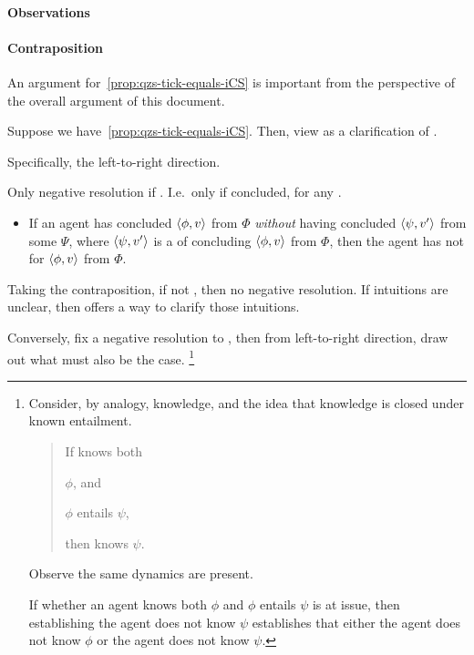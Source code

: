 \paragraph*{Observations}

\paragraph*{Contraposition}

\begin{note}[Contraposition]
  An argument for~\autoref{prop:qzs-tick-equals-iCS} is important from the perspective of the overall argument of this document.

  Suppose we have~\autoref{prop:qzs-tick-equals-iCS}.
  Then, view \izetaS{} as a clarification of \qzS{}.

  Specifically, the left-to-right direction.

  Only negative resolution if \izetaS{}.
  I.e.\ only if concluded, for any \requ{}.

  \begin{itemize}
  \item
    If an agent has concluded \(\langle \phi, v \rangle\) from \(\Phi\) \emph{without} having concluded \(\langle \psi, v' \rangle\) from some \(\Psi\), where \(\langle \psi, v' \rangle\) is a \requ{} of concluding \(\langle \phi, v \rangle\) from \(\Phi\), then the agent has not \csVed{} for \(\langle \phi, v \rangle\) from \(\Phi\).
  \end{itemize}

  Taking the contraposition, if not \izetaS{}, then no negative resolution.
  If intuitions are unclear, then \izetaS{} offers a way to clarify those intuitions.

  Conversely, fix a negative resolution to \qzS{}, then from left-to-right direction, draw out what must also be the case.%
  \footnote{
    Consider, by analogy, knowledge, and the idea that knowledge is closed under known entailment.
    \begin{quote}
      If \vAgent{} knows both
      \begin{enumerate*}[label=(\roman*)]
      \item \(\phi\), and
      \item \(\phi\) entails \(\psi\),
      \end{enumerate*}
      then \vAgent{} knows \(\psi\).
    \end{quote}
    Observe the same dynamics are present.

    If whether an agent knows both \(\phi\) and \(\phi\) entails \(\psi\) is at issue, then establishing the agent does not know \(\psi\) establishes that either the agent does not know \(\phi\) or the agent does not know \(\psi\).

}
\end{note}
